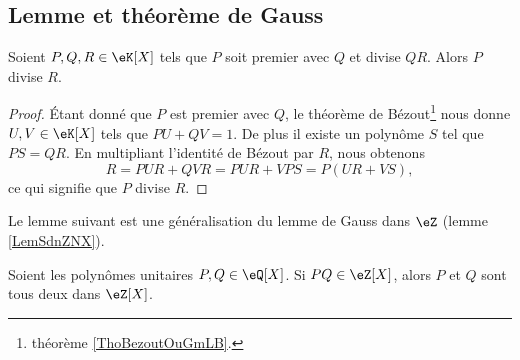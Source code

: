 \subsection{Lemme et théorème de Gauss}

\begin{theorem}  \label{ThoLLgIsig}
    Soient \( P,Q,R\in \eK[X]\) tels que \( P\) soit premier avec \( Q\) et divise \( QR\). Alors \( P\) divise \( R\).
\end{theorem}

\begin{proof}
    Étant donné que \( P\) est premier avec \( Q\), le théorème de Bézout\footnote{théorème \ref{ThoBezoutOuGmLB}.} nous donne \( U,V\in \eK[X]\) tels que \( PU+QV=1\). De plus il existe un polynôme \( S\) tel que \( PS=QR\). En multipliant l'identité de Bézout par \( R\), nous obtenons
    \begin{equation}
        R=PUR+QVR=PUR+VPS=P(UR+VS),
    \end{equation}
    ce qui signifie que \( P\) divise \( R\).
\end{proof}

Le lemme suivant est une généralisation du lemme de Gauss dans \( \eZ\) (lemme \ref{LemSdnZNX}).
\begin{lemma}       \label{LemEfdkZw}   
    Soient les polynômes unitaires \( P,Q\in \eQ[X]\). Si \( PQ\in\eZ[X]\), alors \( P\) et \( Q\) sont tous deux dans \( \eZ[X]\).
\end{lemma}

